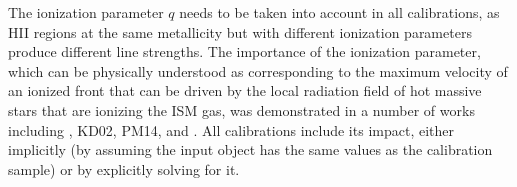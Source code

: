 \documentclass{emulateapj}
\newcommand{\ha}{\ensuremath{\mathrm{H}\alpha}}
\newcommand{\hb}{\ensuremath{\mathrm{H}\beta}}
\begin{document}


%


The ionization parameter $q$ needs to be taken into account in all
calibrations, as HII regions at the same metallicity but with
different ionization parameters produce different line strengths. The
importance of the ionization parameter, which can be physically
understood as corresponding to the maximum velocity of an ionized
front that can be driven by the local radiation field of hot massive
stars that are ionizing the ISM gas, was demonstrated in a number of
works including \citealt{evans85,dopita86}, KD02, PM14, and
\citealt{sanchez15}. All calibrations include its impact, either
implicitly (by assuming the input object has the same values as the
calibration sample) or by explicitly solving for it.
\end{document}
